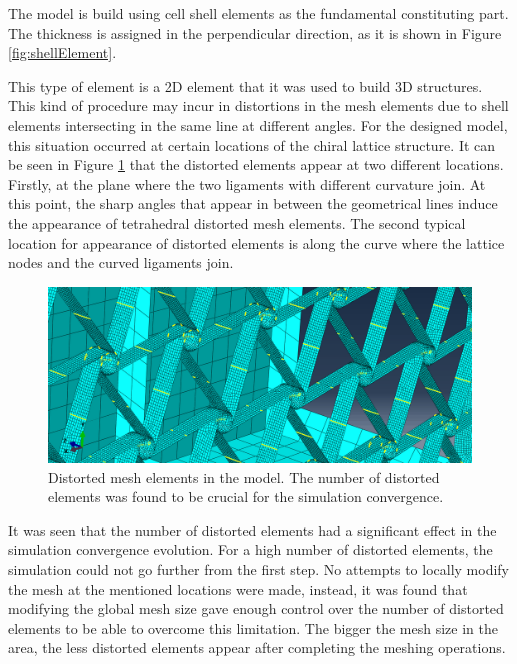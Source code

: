     The model is build using cell shell elements as the fundamental constituting part. The thickness is assigned in the perpendicular direction, as it is shown in Figure \ref{fig:shellElement}.

    This type of element is a 2D element that it was used to build 3D structures. This kind of procedure may incur in distortions in the mesh elements due to shell elements intersecting in the same line at different angles. For the designed model, this situation occurred at certain locations of the chiral lattice structure. It can be seen in Figure \ref{fig:meshDistorted} that the distorted elements appear at two different locations. Firstly, at the plane where the two ligaments with different curvature join. At this point, the sharp angles that appear in between the geometrical lines induce the appearance of tetrahedral distorted mesh elements. The second typical location for appearance of distorted elements is along the curve where the lattice nodes and the curved ligaments join.

    \begin{figure}[!htpb]
      \centering
      \includegraphics[width=0.8 \textwidth]{figures/result-model/meshDistorted}
      \caption[Distorted mesh elements in the model]{Distorted mesh elements in the model. The number of distorted elements was found to be crucial for the simulation convergence.}\label{fig:meshDistorted}
    \end{figure}

    It was seen that the number of distorted elements had a significant effect in the simulation convergence evolution. For a high number of distorted elements, the simulation could not go further from the first step. No attempts to locally modify the mesh at the mentioned locations were made, instead, it was found that modifying the global mesh size gave enough control over the number of distorted elements to be able to overcome this limitation. The bigger the mesh size in the area, the less distorted elements appear after completing the meshing operations.

